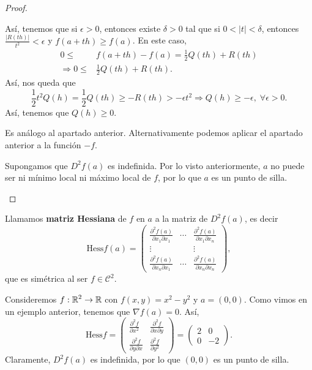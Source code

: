 \begin{proof}
\begin{description}
Así, tenemos que si $\displaystyle \epsilon > 0 $, entonces existe $\displaystyle \delta > 0 $ tal que si $\displaystyle 0 < \left|t\right| < \delta  $, entonces $\displaystyle \frac{ \left|R\left(th\right)\right|}{t ^{2}} < \epsilon  $ y $\displaystyle f\left(a+th\right) \geq f\left(a\right) $. En este caso, 
\[
\begin{split}
	0 \leq & f\left(a+th\right)-f\left(a\right) = \frac{1}{2}Q\left(th\right) + R\left(th\right) \\
	\Rightarrow 0 \leq & \frac{1}{2}Q\left(th\right) + R\left(th\right) .
\end{split}
\]
Así, nos queda que 
\[\frac{1}{2}t ^{2}Q\left(h\right) =\frac{1}{2} Q\left(th\right) \geq - R\left(th\right) > -\epsilon t ^{2} \Rightarrow Q\left(h\right) \geq -\epsilon, \; \forall \epsilon > 0 .\]
Así, tenemos que $\displaystyle Q\left(h\right) \geq 0 $. 
\item[(b)] Es análogo al apartado anterior. Alternativamente podemos aplicar el apartado anterior a la función $\displaystyle -f $. 
\item[(c)] Supongamos que $\displaystyle D^{2}f\left(a\right) $ es indefinida. Por lo visto anteriormente, $\displaystyle a $ no puede ser ni mínimo local ni máximo local de $\displaystyle f $, por lo que $\displaystyle a $ es un punto de silla.
\end{description}
\end{proof}
\begin{definition}
Llamamos \textbf{matriz Hessiana} de $\displaystyle f $ en $\displaystyle a $ a la matriz de $\displaystyle D^{2}f\left(a\right) $, es decir
\[\text{Hess}f\left(a\right) = \begin{pmatrix} \frac{\partial^{2}f\left(a\right)}{\partial x_{1} \partial x_{1}} & \cdots & \frac{\partial^{2}f\left(a\right)}{\partial x_{1}\partial x_{n}} \\ \vdots & & \vdots \\ \frac{\partial^{2}f\left(a\right)}{\partial x_{n}\partial x_{1}} & \cdots & \frac{\partial ^{2}f\left(a\right)}{\partial x_{n} \partial x_{n}} \end{pmatrix} ,\]
que es simétrica al ser $\displaystyle f \in \mathcal{C}^{2} $.
\end{definition}
\begin{eg}
Consideremos $\displaystyle f : \mathbb{R}^{2} \to \mathbb{R} $ con $\displaystyle f\left(x,y\right) = x^{2}-y^{2} $ y $\displaystyle a = \left(0,0\right) $. Como vimos en un ejemplo anterior, tenemos que $\displaystyle \nabla f\left(a\right)= 0 $. Así, 
\[\text{Hess} f = \begin{pmatrix} \frac{\partial^{2}f}{\partial x^{2}} & \frac{\partial^{2}f}{\partial x \partial y}  \\ \frac{\partial ^{2}f}{\partial y \partial x} & \frac{\partial ^{2}f}{\partial y^{2}} \end{pmatrix}= \begin{pmatrix} 2 & 0 \\ 0 & - 2 \end{pmatrix} .\]
Claramente, $\displaystyle D^{2}f\left(a\right) $ es indefinida, por lo que $\displaystyle \left(0,0\right) $ es un punto de silla. 
\end{eg}
